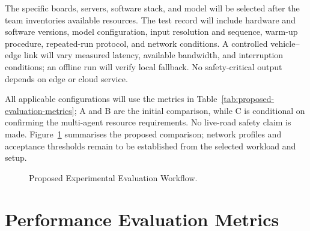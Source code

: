 \documentclass[12pt,a4paper,oneside]{report}
\begin{document}
The specific boards, servers, software stack, and model will be selected
after the team inventories available resources. The test record will
include hardware and software versions, model configuration, input
resolution and sequence, warm-up procedure, repeated-run protocol, and
network conditions. A controlled vehicle--edge link will vary measured
latency, available bandwidth, and interruption conditions; an offline run
will verify local fallback. No safety-critical output depends on edge or
cloud service.

All applicable configurations will use the metrics in
Table~\ref{tab:proposed-evaluation-metrics}; A and B are the initial
comparison, while C is conditional on confirming the multi-agent resource
requirements. No live-road safety claim is made. Figure~\ref{fig:experimental-workflow}
summarises the proposed comparison; network profiles and acceptance
thresholds remain to be established from the selected workload and setup.

\begin{figure}[H]
  \centering
  \caption{Proposed Experimental Evaluation Workflow.}
  \label{fig:experimental-workflow}
\end{figure}

\section{Performance Evaluation Metrics}
\end{document}
